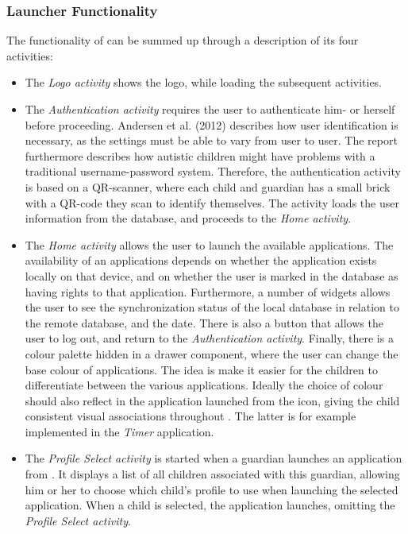 \subsubsection{Launcher Functionality}
The functionality of \launcher can be summed up through a description of its four activities:
\begin{itemize}
	\item The \textit{Logo activity} shows the \giraf logo, while loading the subsequent activities.
	\item The \textit{Authentication activity} requires the user to authenticate him- or herself before proceeding. 
	Andersen et al. (2012) describes how user identification is necessary, as the \giraf settings must be able to vary from user to user. 
	The report furthermore describes how autistic children might have problems with a traditional username-password system. 
	Therefore, the authentication activity is based on a QR-scanner, where each child and guardian has a small brick with a QR-code they scan to identify 		  	themselves. 
	The activity loads the user information from the database, and proceeds to the \textit{Home activity}.
	\item The \textit{Home activity} allows the user to launch the available \giraf applications. 
	The availability of an applications depends on whether the application exists locally on that device, and on whether the user is marked in the database as 	having rights to that application. 
	Furthermore, a number of widgets allows the user to see the synchronization status of the local database in relation to the remote database, and the 	 	date. 
	There is also a button that allows the user to log out, and return to the \textit{Authentication activity}. 
	Finally, there is a colour palette hidden in a drawer component, where the user can change the base colour of applications. 
	The idea is make it easier for the children to differentiate between the various applications. 
	Ideally the choice of colour should also reflect in the application launched from the icon, giving the child consistent visual associations throughout \giraf.
	The latter is for example implemented in the \textit{Timer} application.
	\item The \textit{Profile Select activity} is started when a guardian launches an application from \launcher. 
	It displays a list of all children associated with this guardian, allowing him or her to choose which child's profile to use when launching the selected application. 
	When a child is selected, the application launches, omitting the \textit{Profile Select activity}.
\end{itemize}



